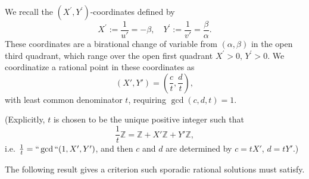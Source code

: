 \documentclass[12pt,letterpaper, reqno]{amsart}
\newtheorem{prop}[thm]{Proposition}
\theoremstyle{definition}
\theoremstyle{remark}
\newcommand{\ZZ}{\ensuremath{\mathbb{Z}}}
\newcommand{\uu}{{u'}}
\newcommand{\vv}{{v'}}
\begin{document}
We recall the  $(X^{'}, Y^{'})$-coordinates defined by 
$$X^{'} := \frac{1}{\uu} = -\beta, \quad  Y^{' }:= \frac1{\vv} = \frac{\beta}{\alpha}.$$
These coordinates are a birational
change of variable from $(\alpha, \beta)$ in the open third
quadrant, which  range over the open first quadrant $X^{'} >0, \, Y^{'} >0$.
We coordinatize a rational point in these coordinates as 
$$(X', Y') = (\frac{c}{t}, \frac{d}{t}),$$
 with least common denominator $t$, requiring
$\gcd(c, d, t)=1$. 

(Explicitly, $t$ is chosen to be the unique  positive integer such that
\[ \frac1t\ZZ = \ZZ + X'\ZZ + Y'\ZZ,\]
i.e. $\frac1t = ``\gcd``(1,X',Y')$, and then $c$ and $d$ are determined by $c = tX'$, $d = tY'$.)

The following result  gives a criterion such sporadic rational
solutions must satisfy.

\end{document}
